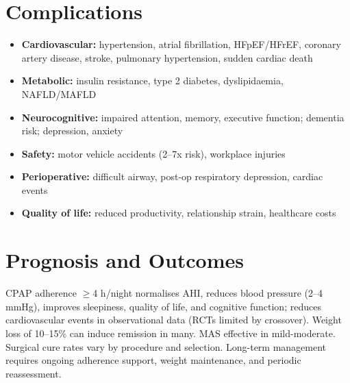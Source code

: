 \section*{Complications}
\begin{itemize}
    \item \textbf{Cardiovascular:} hypertension, atrial fibrillation, HFpEF/HFrEF, coronary artery disease, stroke, pulmonary hypertension, sudden cardiac death
    \item \textbf{Metabolic:} insulin resistance, type 2 diabetes, dyslipidaemia, NAFLD/MAFLD
    \item \textbf{Neurocognitive:} impaired attention, memory, executive function; dementia risk; depression, anxiety
    \item \textbf{Safety:} motor vehicle accidents (2--7x risk), workplace injuries
    \item \textbf{Perioperative:} difficult airway, post-op respiratory depression, cardiac events
    \item \textbf{Quality of life:} reduced productivity, relationship strain, healthcare costs
\end{itemize}

\section*{Prognosis and Outcomes}
CPAP adherence $\ge$4 h/night normalises AHI, reduces blood pressure (2--4 mmHg), improves sleepiness, quality of life, and cognitive function; reduces cardiovascular events in observational data (RCTs limited by crossover). Weight loss of 10--15\% can induce remission in many. MAS effective in mild-moderate. Surgical cure rates vary by procedure and selection. Long-term management requires ongoing adherence support, weight maintenance, and periodic reassessment.

